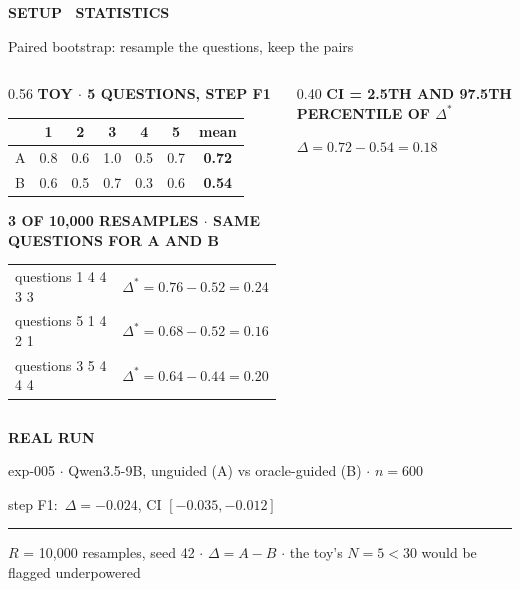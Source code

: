 \documentclass[aspectratio=169,11pt]{beamer}
\providecommand{\textls}[2][]{#2}
\newcommand{\lsp}[1]{\textls[140]{#1}}
\newcommand{\slidehead}[2]{%
  {\color{accent}\fontsize{6.8}{8}\selectfont\bfseries\lsp{#1}\par}%
  \vspace{2.4mm}%
  {\color{ink}\fontsize{15}{18}\selectfont #2\par}%
  \vspace{3.4mm}%
}
\newcommand{\thinrule}[1]{\noindent\textcolor{#1}{\rule{\linewidth}{0.4pt}}\par}
\newcommand{\colhead}[1]{{\color{accent}\fontsize{6.5}{8}\selectfont\bfseries\lsp{#1}}}
\newcommand{\bigresult}[3][30]{{\centering{\color{accent}\fontsize{#1}{#1}\selectfont #2\par}%
  \vspace{2mm}{\color{muted}\footnotesize #3\par}}}
\newcommand{\srcreal}[2]{%
  \vfill{\setlength{\fboxsep}{1.4mm}\colorbox{accentsoft}{\parbox{\dimexpr\linewidth-2.8mm\relax}{%
    \footnotesize\parbox[t]{18mm}{\textcolor{accentink}{\bfseries\lsp{REAL RUN}}}%
    \parbox[t]{\dimexpr\linewidth-18mm\relax}{\leavevmode\color{inktwo}exp-005 $\cdot$ Qwen3.5-9B,
     unguided (A) vs oracle-guided (B) $\cdot$ $n=600$\par\vspace{0.8mm}\textcolor{ink}{#1}}}}}\par
  \vspace{1.6mm}\thinrule{rulec}\vspace{1.5mm}%
  {\color{muted}\ttfamily\fontsize{6.6}{8}\selectfont #2\par}}
\begin{document}
\begin{frame}[t]
\slidehead{SETUP \textperiodcentered\ STATISTICS}{Paired bootstrap: resample the questions, keep the pairs}
\begin{columns}[T,onlytextwidth]
\begin{column}{0.56\textwidth}
\colhead{TOY $\cdot$ 5 QUESTIONS, STEP F1}\par\vspace{1mm}
\footnotesize
{\setlength{\tabcolsep}{3.2pt}%
\begin{tabular}{@{}l*{5}{c}c@{}}
 & 1 & 2 & 3 & 4 & 5 & mean\\
\midrule
A & 0.8 & 0.6 & 1.0 & 0.5 & 0.7 & \textbf{0.72}\\
B & 0.6 & 0.5 & 0.7 & 0.3 & 0.6 & \textbf{0.54}\\
\bottomrule
\end{tabular}}
\par\vspace{2.4mm}
\colhead{3 OF 10,000 RESAMPLES $\cdot$ SAME QUESTIONS FOR A AND B}\par\vspace{1mm}
{\setlength{\tabcolsep}{3.2pt}%
\begin{tabular}{@{}lr@{}}
questions 1 4 4 3 3 & $\Delta^*=0.76-0.52=0.24$\\
questions 5 1 4 2 1 & $\Delta^*=0.68-0.52=0.16$\\
questions 3 5 4 4 4 & $\Delta^*=0.64-0.44=0.20$\\
\end{tabular}}
\end{column}
\begin{column}{0.40\textwidth}
\colhead{CI = 2.5TH AND 97.5TH PERCENTILE OF $\Delta^*$}\par\vspace{1mm}
{\centering\large$\Delta=0.72-0.54=0.18$\par}
\vspace{2mm}
\bigresult[22]{[0.12,\ 0.24]}{$0\notin\mathrm{CI}$: significant}
\end{column}
\end{columns}
\srcreal{step F1:\ $\Delta=-0.024$, CI $[-0.035,-0.012]$}{$R$ = 10,000 resamples, seed 42 $\cdot$ $\Delta=A-B$ $\cdot$ the toy's $N=5<30$ would be flagged underpowered}
\end{frame}
\end{document}
